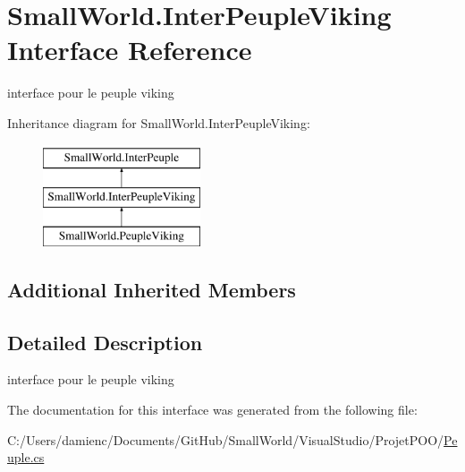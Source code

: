 \hypertarget{interface_small_world_1_1_inter_peuple_viking}{\section{Small\-World.\-Inter\-Peuple\-Viking Interface Reference}
\label{interface_small_world_1_1_inter_peuple_viking}
}


interface pour le peuple viking  


Inheritance diagram for Small\-World.\-Inter\-Peuple\-Viking\-:\begin{figure}[H]
\begin{center}
\leavevmode
\includegraphics[height=3.000000cm]{interface_small_world_1_1_inter_peuple_viking}
\end{center}
\end{figure}
\subsection*{Additional Inherited Members}


\subsection{Detailed Description}
interface pour le peuple viking 

The documentation for this interface was generated from the following file\-:\begin{DoxyCompactItemize}
\item 
C\-:/\-Users/damienc/\-Documents/\-Git\-Hub/\-Small\-World/\-Visual\-Studio/\-Projet\-P\-O\-O/\hyperlink{_peuple_8cs}{Peuple.\-cs}\end{DoxyCompactItemize}
